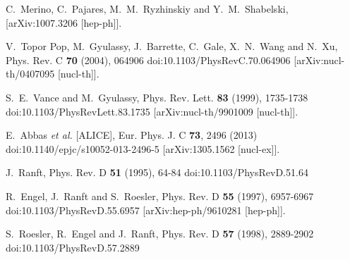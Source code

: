 \begin{thebibliography}{99}
C.~Merino, C.~Pajares, M.~M.~Ryzhinskiy and Y.~M.~Shabelski,
[arXiv:1007.3206 [hep-ph]].


V.~Topor Pop, M.~Gyulassy, J.~Barrette, C.~Gale, X.~N.~Wang and N.~Xu,
Phys. Rev. C \textbf{70} (2004), 064906
doi:10.1103/PhysRevC.70.064906
[arXiv:nucl-th/0407095 [nucl-th]].

S.~E.~Vance and M.~Gyulassy,
Phys. Rev. Lett. \textbf{83} (1999), 1735-1738
doi:10.1103/PhysRevLett.83.1735
[arXiv:nucl-th/9901009 [nucl-th]].

E.~Abbas \textit{et al.} [ALICE],
Eur. Phys. J. C \textbf{73}, 2496 (2013)
doi:10.1140/epjc/s10052-013-2496-5
[arXiv:1305.1562 [nucl-ex]].


J.~Ranft,
Phys. Rev. D \textbf{51} (1995), 64-84
doi:10.1103/PhysRevD.51.64

R.~Engel, J.~Ranft and S.~Roesler,
Phys. Rev. D \textbf{55} (1997), 6957-6967
doi:10.1103/PhysRevD.55.6957
[arXiv:hep-ph/9610281 [hep-ph]].

S.~Roesler, R.~Engel and J.~Ranft,
Phys. Rev. D \textbf{57} (1998), 2889-2902
doi:10.1103/PhysRevD.57.2889


\end{thebibliography}
